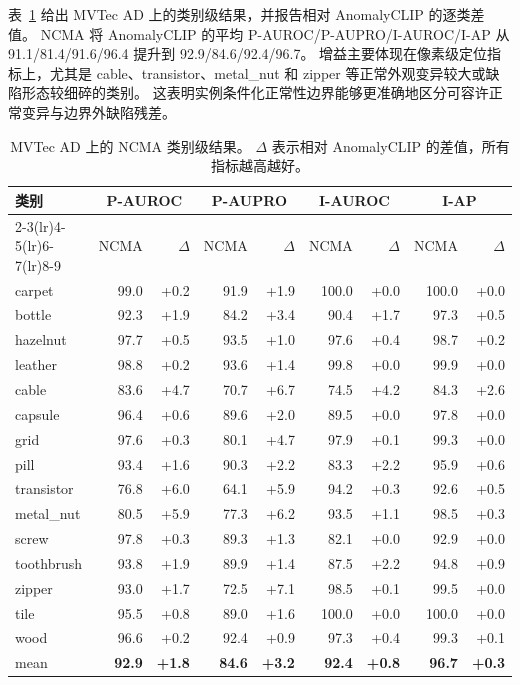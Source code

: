 \documentclass[UTF8,11pt,a4paper,fontset=none]{ctexart}
\newcommand{\method}{NCMA}
\begin{document}
表~\ref{tab:mvtec_results} 给出 MVTec AD 上的类别级结果，并报告相对 AnomalyCLIP 的逐类差值。
\method{} 将 AnomalyCLIP 的平均 P-AUROC/P-AUPRO/I-AUROC/I-AP 从 91.1/81.4/91.6/96.4 提升到 92.9/84.6/92.4/96.7。
增益主要体现在像素级定位指标上，尤其是 cable、transistor、metal\_nut 和 zipper 等正常外观变异较大或缺陷形态较细碎的类别。
这表明实例条件化正常性边界能够更准确地区分可容许正常变异与边界外缺陷残差。

\begin{table}[H]
  \centering
  \caption{MVTec AD 上的 \method{} 类别级结果。 \(\Delta\) 表示相对 AnomalyCLIP 的差值，所有指标越高越好。}
  \label{tab:mvtec_results}
  \scriptsize
  \setlength{\tabcolsep}{3.2pt}
  \begin{tabular}{lrrrrrrrr}
    \toprule
    \multirow{2}{*}{类别} &
    \multicolumn{2}{c}{P-AUROC} &
    \multicolumn{2}{c}{P-AUPRO} &
    \multicolumn{2}{c}{I-AUROC} &
    \multicolumn{2}{c}{I-AP} \\
    \cmidrule(lr){2-3}\cmidrule(lr){4-5}\cmidrule(lr){6-7}\cmidrule(lr){8-9}
    & \method{} & \(\Delta\) & \method{} & \(\Delta\) & \method{} & \(\Delta\) & \method{} & \(\Delta\) \\
    \midrule
    carpet & 99.0 & +0.2 & 91.9 & +1.9 & 100.0 & +0.0 & 100.0 & +0.0 \\
    bottle & 92.3 & +1.9 & 84.2 & +3.4 & 90.4 & +1.7 & 97.3 & +0.5 \\
    hazelnut & 97.7 & +0.5 & 93.5 & +1.0 & 97.6 & +0.4 & 98.7 & +0.2 \\
    leather & 98.8 & +0.2 & 93.6 & +1.4 & 99.8 & +0.0 & 99.9 & +0.0 \\
    cable & 83.6 & +4.7 & 70.7 & +6.7 & 74.5 & +4.2 & 84.3 & +2.6 \\
    capsule & 96.4 & +0.6 & 89.6 & +2.0 & 89.5 & +0.0 & 97.8 & +0.0 \\
    grid & 97.6 & +0.3 & 80.1 & +4.7 & 97.9 & +0.1 & 99.3 & +0.0 \\
    pill & 93.4 & +1.6 & 90.3 & +2.2 & 83.3 & +2.2 & 95.9 & +0.6 \\
    transistor & 76.8 & +6.0 & 64.1 & +5.9 & 94.2 & +0.3 & 92.6 & +0.5 \\
    metal\_nut & 80.5 & +5.9 & 77.3 & +6.2 & 93.5 & +1.1 & 98.5 & +0.3 \\
    screw & 97.8 & +0.3 & 89.3 & +1.3 & 82.1 & +0.0 & 92.9 & +0.0 \\
    toothbrush & 93.8 & +1.9 & 89.9 & +1.4 & 87.5 & +2.2 & 94.8 & +0.9 \\
    zipper & 93.0 & +1.7 & 72.5 & +7.1 & 98.5 & +0.1 & 99.5 & +0.0 \\
    tile & 95.5 & +0.8 & 89.0 & +1.6 & 100.0 & +0.0 & 100.0 & +0.0 \\
    wood & 96.6 & +0.2 & 92.4 & +0.9 & 97.3 & +0.4 & 99.3 & +0.1 \\
    \midrule
    mean & \textbf{92.9} & \textbf{+1.8} & \textbf{84.6} & \textbf{+3.2} & \textbf{92.4} & \textbf{+0.8} & \textbf{96.7} & \textbf{+0.3} \\
    \bottomrule
  \end{tabular}
\end{table}
\end{document}
